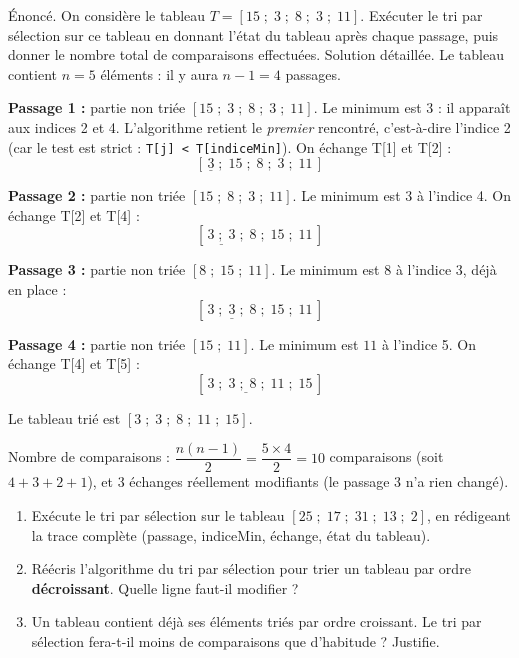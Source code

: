 \documentclass[11pt]{article}
\begin{document}
\begin{exoresolu}
Énoncé. On considère le tableau $T = [15 \;;\; 3 \;;\; 8 \;;\; 3 \;;\; 11]$. Exécuter le tri par sélection sur ce tableau en donnant l'état du tableau après chaque passage, puis donner le nombre total de comparaisons effectuées.
\tcblower
Solution détaillée. Le tableau contient $n = 5$ éléments : il y aura $n - 1 = 4$ passages.

\textbf{Passage 1 :} partie non triée $[15 \;;\; 3 \;;\; 8 \;;\; 3 \;;\; 11]$. Le minimum est $3$ : il apparaît aux indices 2 et 4. L'algorithme retient le \emph{premier} rencontré, c'est-à-dire l'indice 2 (car le test est strict : \texttt{T[j] < T[indiceMin]}). On échange T[1] et T[2] :
\[ [\,\underline{3} \;;\; 15 \;;\; 8 \;;\; 3 \;;\; 11\,] \]

\textbf{Passage 2 :} partie non triée $[15 \;;\; 8 \;;\; 3 \;;\; 11]$. Le minimum est $3$ à l'indice 4. On échange T[2] et T[4] :
\[ [\,\underline{3 \;;\; 3} \;;\; 8 \;;\; 15 \;;\; 11\,] \]

\textbf{Passage 3 :} partie non triée $[8 \;;\; 15 \;;\; 11]$. Le minimum est $8$ à l'indice 3, déjà en place :
\[ [\,\underline{3 \;;\; 3 \;;\; 8} \;;\; 15 \;;\; 11\,] \]

\textbf{Passage 4 :} partie non triée $[15 \;;\; 11]$. Le minimum est $11$ à l'indice 5. On échange T[4] et T[5] :
\[ [\,\underline{3 \;;\; 3 \;;\; 8 \;;\; 11} \;;\; 15\,] \]

Le tableau trié est $[3 \;;\; 3 \;;\; 8 \;;\; 11 \;;\; 15]$.

Nombre de comparaisons : $\dfrac{n(n-1)}{2} = \dfrac{5 \times 4}{2} = 10$ comparaisons (soit $4 + 3 + 2 + 1$), et 3 échanges réellement modifiants (le passage 3 n'a rien changé).
\end{exoresolu}

\begin{exercice}
\begin{enumerate}
\item Exécute le tri par sélection sur le tableau $[25 \;;\; 17 \;;\; 31 \;;\; 13 \;;\; 2]$, en rédigeant la trace complète (passage, indiceMin, échange, état du tableau).
\item Réécris l'algorithme du tri par sélection pour trier un tableau par ordre \textbf{décroissant}. Quelle ligne faut-il modifier ?
\item Un tableau contient déjà ses éléments triés par ordre croissant. Le tri par sélection fera-t-il moins de comparaisons que d'habitude ? Justifie.
\end{enumerate}
\end{exercice}
\end{document}

